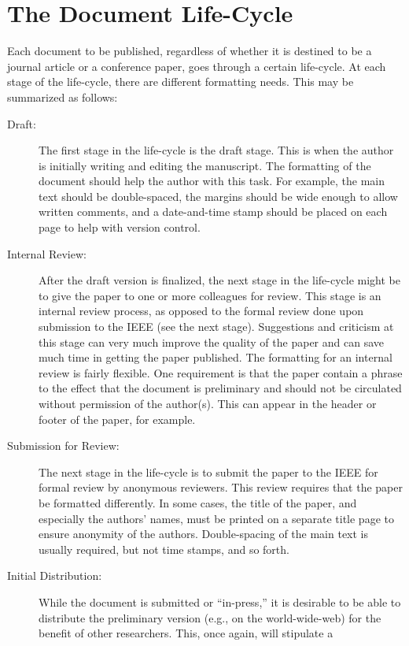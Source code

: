 \documentclass[%
	final,
	notitlepage,
	narroweqnarray,
	inline,
	twoside,
	]{ieee}
\begin{document}
\section{The Document Life-Cycle}

Each document to be published, regardless of whether it is destined to
be a journal article or a conference paper, goes through a certain
life-cycle. At each stage of the life-cycle, there are different
formatting needs. This may be summarized as follows:
\begin{description}
\item[Draft:] The first stage in the life-cycle is the draft stage.
    This is when the author is initially writing and editing the 
    manuscript. The formatting of the document should help the author 
    with this task. For example, the main text should be
    double-spaced, the margins should be wide enough to allow written
    comments, and a date-and-time stamp should be placed on each page to 
    help with version control.
\item[Internal Review:] After the draft version is finalized,
    the next stage in the life-cycle might be to give the paper
    to one or more colleagues for review. This stage is an internal review
    process, as opposed to the formal review done upon submission
    to the IEEE (see the next stage). Suggestions and 
    criticism at this stage can very much improve the quality of the 
    paper and can save much time in getting the paper 
    published. The formatting for an internal review is fairly flexible. 
    One requirement is that the paper contain a phrase to the effect that
    the document is preliminary and should not be circulated without
    permission of the author(s).  This can appear in the header or footer of
    the paper, for example.
\item[Submission for Review:] The next stage in the life-cycle is to 
    submit the paper to the IEEE for formal review by anonymous reviewers. 
    This review requires that the paper be formatted differently. In some 
    cases, the title of the paper, and especially the authors' names, 
    must be printed on a separate title page to ensure anonymity of the
    authors. Double-spacing of the main text is usually required, but not 
    time stamps, and so forth.
\item[Initial Distribution:] While the document is submitted or 
    ``in-press,'' it is desirable to be able to distribute the 
    preliminary version (e.g., on the world-wide-web) for the 
    benefit of other researchers. This, once again, will stipulate a 

\end{description}
\end{document}
